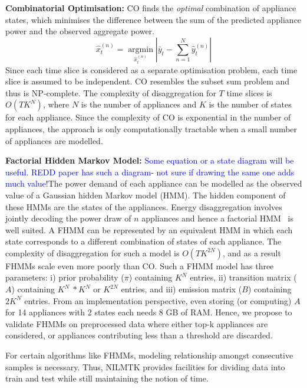 \documentclass{sig-alternate}
\newcommand{\bluecolor}[1]{\textcolor{blue}{#1}}
\begin{document}
\textbf{Combinatorial Optimisation:}
CO finds the \textit{optimal} combination of appliance states, which minimises the difference between the sum of the predicted appliance power and the observed aggregate power. 
\begin{equation}
\hat{x}^{(n)}_t=\operatorname*{arg min}_{\hat{x}^{(n)}_t}\left|\bar{y}_t-\sum\limits_{n=1}^{N}\hat{y}^{(n)}_t\right|
\end{equation}
Since each time slice is considered as a separate optimisation problem, each time slice is assumed to be independent.
CO resembles the subset sum problem and thus is NP-complete. The complexity of disaggregation for $T$ time slices is $O(TK^N)$, where $N$ is the number of appliances and $K$ is the number of states for each appliance. Since the complexity of CO is exponential in the number of appliances, the approach is only computationally tractable when a small number of appliances are modelled.

\textbf{Factorial Hidden Markov Model:} \bluecolor{Some equation or a state diagram will be useful. REDD paper has such a diagram- not sure if drawing the same one adds much value!}The power demand of each appliance can be modelled as the observed value of a Gaussian hidden Markov model (HMM). The hidden component of these HMMs are the states of the appliances. Energy disaggregation involves jointly decoding the power draw of $n$ appliances and hence a factorial HMM~\cite{fhmm} is well suited. A FHMM can be represented by an equivalent HMM in which each state corresponds to a different combination of states of each appliance. The complexity of disaggregation for such a model is $O(TK^{2N})$, and as a result FHMMs scale even more poorly than CO. Such a FHMM model has three parameters: i) prior probability ($\pi$) containing $K^N$ entries, ii) transition matrix ($A$) containing $K^N~*K^N$ or $K^{2N}$ entries, and iii) emission matrix ($B$) containing $2K^N$ entries. From an implementation perspective, even storing (or computing) $A$ for 14 appliances with 2 states each needs 8 GB of RAM. Hence, we propose to validate FHMMs on preprocessed data where either top-k appliances are considered, or appliances contributing less than a threshold are discarded.

For certain algorithms like FHMMs, modeling relationship amongst consecutive samples is necessary. Thus, NILMTK provides facilities for dividing data into train and test while still maintaining the notion of time.
\end{document}
